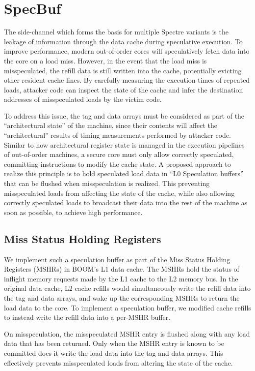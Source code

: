 \section{SpecBuf}
The side-channel which forms the basis for multiple Spectre variants is the leakage of information through the data cache during speculative execution.
To improve performance, modern out-of-order cores will speculatively fetch data into the core on a load miss. 
However, in the event that the load miss is misspeculated, the refill data is still written into the cache, potentially evicting other resident cache lines.
By carefully measuring the execution times of repeated loads, attacker code can inspect the state of the cache and infer the destination addresses of misspeculated loads by the victim code.

To address this issue, the tag and data arrays must be considered as part of the ``architectural state'' of the machine, since their contents will affect the ``architectural'' results of timing measurements performed by attacker code.
Similar to how architectural register state is managed in the execution pipelines of out-of-order machines, a secure core must only allow correctly speculated, committing instructions to modify the cache state.
A proposed approach to realize this principle is to hold speculated load data in ``L0 Speculation buffers'' that can be flushed when misspeculation is realized.
This preventing misspeculated loads from affecting the state of the cache, while also allowing correctly speculated loads to broadcast their data into the rest of the machine as soon as possible, to achieve high performance.

\subsection{Miss Status Holding Registers}
We implement such a speculation buffer as part of the Miss Status Holding Registers (MSHRs) in BOOM's L1 data cache. The MSHRs hold the status of inflight memory requests made by the L1 cache to the L2 memory bus.
In the original data cache, L2 cache refills would simultaneously write the refill data into the tag and data arrays, and wake up the corresponding MSHRs to return the load data to the core.
To implement a speculation buffer, we modified cache refills to instead write the refill data into a per-MSHR buffer.

On misspeculation, the misspeculated MSHR entry is flushed along with any load data that has been returned. Only when the MSHR entry is known to be committed does it write the load data into the tag and data arrays. This effectively prevents misspeculated loads from altering the state of the cache.

